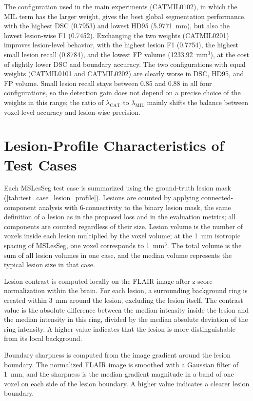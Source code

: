 The configuration used in the main experiments (CATMIL0102), in which the
MIL term has the larger weight, gives the best global segmentation
performance, with the highest DSC (0.7953) and lowest HD95 (5.9771~mm), but
also the lowest lesion-wise F1 (0.7452). Exchanging the two weights
(CATMIL0201) improves lesion-level behavior, with the highest lesion F1
(0.7754), the highest small lesion recall (0.8784), and the lowest FP
volume (1233.92~mm$^3$), at the cost of slightly lower DSC and boundary
accuracy. The two configurations with equal weights (CATMIL0101 and
CATMIL0202) are clearly worse in DSC, HD95, and FP volume. Small lesion
recall stays between 0.85 and 0.88 in all four configurations, so the
detection gain does not depend on a precise choice of the weights in this
range; the ratio of $\lambda_{\text{CAT}}$ to $\lambda_{\text{MIL}}$ mainly
shifts the balance between voxel-level accuracy and lesion-wise precision.

\section{Lesion-Profile Characteristics of Test Cases}
\label{appendix:test-case-lesion-profile}

Each MSLesSeg test case is summarized using the ground-truth lesion mask
(\cref{tab:test_case_lesion_profile}). Lesions are counted by applying
connected-component analysis with 6-connectivity to the binary lesion
mask, the same definition of a lesion as in the proposed loss and in the
evaluation metrics; all components are counted regardless of their size.
Lesion volume is the number of voxels inside each lesion multiplied by the
voxel volume; at the 1~mm isotropic spacing of MSLesSeg, one voxel
corresponds to 1~mm$^3$. The total volume is the sum of all lesion volumes
in one case, and the median volume represents the typical lesion size in
that case.

Lesion contrast is computed locally on the FLAIR image after z-score
normalization within the brain. For each lesion, a surrounding background
ring is created within 3~mm around the lesion, excluding the lesion itself.
The contrast value is the absolute difference between the median intensity
inside the lesion and the median intensity in this ring, divided by the
median absolute deviation of the ring intensity. A higher value indicates
that the lesion is more distinguishable from its local background.

Boundary sharpness is computed from the image gradient around the lesion
boundary. The normalized FLAIR image is smoothed with a Gaussian filter of
1~mm, and the sharpness is the median gradient magnitude in a band of one
voxel on each side of the lesion boundary. A higher value indicates a
clearer lesion boundary.

